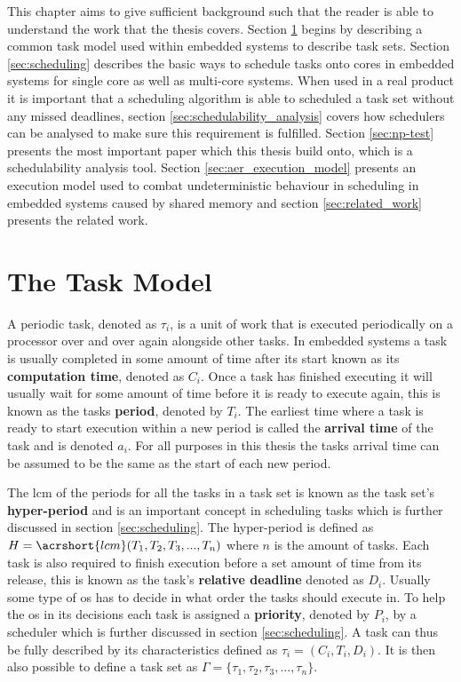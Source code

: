 \documentclass{kththesis}
\begin{document}
This chapter aims to give sufficient background such that the reader is able to understand the work
that the thesis covers. Section \ref{sec:the_task_model} begins by describing a common task model
used within embedded systems to describe task sets. Section \ref{sec:scheduling} describes the basic
ways to schedule tasks onto cores in embedded systems for single core as well as multi-core systems.
When used in a real product it is important that a scheduling algorithm is able to scheduled a task
set without any missed deadlines, section \ref{sec:schedulability_analysis} covers how schedulers
can be analysed to make sure this requirement is fulfilled. Section \ref{sec:np-test} presents the
most important paper which this thesis build onto, which is a schedulability analysis tool. Section
\ref{sec:aer_execution_model} presents an execution model used to combat undeterministic behaviour
in scheduling in embedded systems caused by shared memory and section \ref{sec:related_work}
presents the related work.


\section{The Task Model} \label{sec:the_task_model}

A periodic task, denoted as $\tau_i$, is a unit of work that is executed periodically on a processor
over and over again alongside other tasks. In embedded systems a task is usually completed in some
amount of time after its start known as its \textbf{computation time}, denoted as $C_i$. Once a task
has finished executing it will usually wait for some amount of time before it is ready to execute
again, this is known as the tasks \textbf{period}, denoted by $T_i$. The earliest time where a task
is ready to start execution within a new period is called the \textbf{arrival time} of the task and
is denoted $ a_i $.  For all purposes in this thesis the tasks arrival time can be assumed to be the
same as the start of each new period.

The \acrfull{lcm} of the periods for all the tasks in a task set is known as the task set's
\textbf{hyper-period} and is an important concept in scheduling tasks which is further discussed
in section \ref{sec:scheduling}. The hyper-period is defined as $H = \acrshort{lcm}(T_1, T_2, T_3,
..., T_n)$ where $n$ is the amount of tasks. Each task is also required to finish execution before a
set amount of time from its release, this is known as the task's \textbf{relative deadline} denoted
as $D_i$. Usually some type of \acrfull{os} has to decide in what order the tasks should execute
in. To help the \acrshort{os} in its decisions each task is assigned a \textbf{priority}, denoted by
$P_i$, by a scheduler which is further discussed in section \ref{sec:scheduling}. A task can thus
be fully described by its characteristics defined as $\tau_i = (C_i, T_i, D_i)$. It is then also
possible to define a task set as $ \Gamma = \{\tau_1, \tau_2, \tau_3, ..., \tau_n\} $. 
\end{document}
